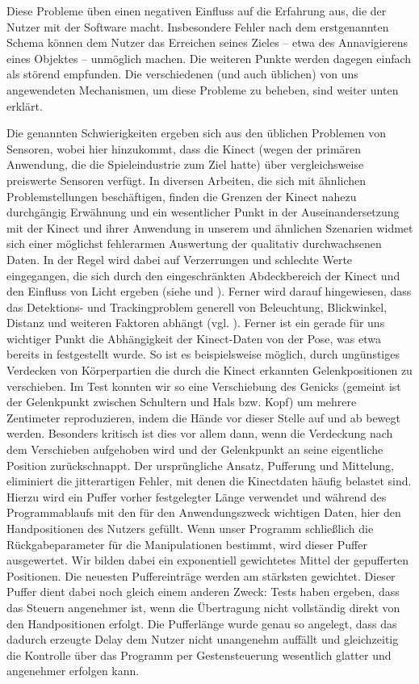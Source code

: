 \par
	Diese Probleme üben einen negativen Einfluss auf die Erfahrung aus, die der Nutzer mit der Software macht. Insbesondere Fehler nach dem erstgenannten Schema können dem Nutzer das Erreichen seines Zieles -- etwa des Annavigierens eines Objektes -- unmöglich machen. Die weiteren Punkte werden dagegen einfach als störend empfunden. Die verschiedenen (und auch üblichen) von uns angewendeten Mechanismen, um diese Probleme zu beheben, sind weiter unten erklärt.\par
	Die genannten Schwierigkeiten ergeben sich aus den üblichen Problemen von Sensoren, wobei hier hinzukommt, dass die Kinect (wegen der primären Anwendung, die die Spieleindustrie zum Ziel hatte) über vergleichsweise preiswerte Sensoren verfügt. In diversen Arbeiten, die sich mit ähnlichen Problemstellungen beschäftigen, finden die Grenzen der Kinect nahezu durchgängig Erwähnung und ein wesentlicher Punkt in der Auseinandersetzung mit der Kinect und ihrer Anwendung in unserem und ähnlichen Szenarien widmet sich einer möglichst fehlerarmen Auswertung der qualitativ durchwachsenen Daten. In der Regel wird dabei auf Verzerrungen und schlechte Werte eingegangen, die sich durch den eingeschränkten \glqq Abdeckbereich\grqq{} der Kinect und den Einfluss von Licht ergeben (siehe \cite{bodyprop} und \cite{kinectlight}). Ferner wird darauf hingewiesen, dass das Detektions- und Trackingproblem generell von Beleuchtung, Blickwinkel, Distanz und weiteren Faktoren abhängt (vgl. \cite{thermalsens}). Ferner ist ein gerade für uns wichtiger Punkt die Abhängigkeit der Kinect-Daten von der Pose, was etwa bereits in \cite{biomid} festgestellt wurde. So ist es beispielsweise möglich, durch ungünstiges Verdecken von Körperpartien die durch die Kinect erkannten Gelenkpositionen zu verschieben. Im Test konnten wir so eine Verschiebung des Genicks (gemeint ist der Gelenkpunkt zwischen Schultern und Hals bzw. Kopf) um mehrere Zentimeter reproduzieren, indem die Hände vor dieser Stelle auf und ab bewegt werden. Besonders kritisch ist dies vor allem dann, wenn die Verdeckung nach dem Verschieben aufgehoben wird und der Gelenkpunkt an seine eigentliche Position \glqq zurückschnappt\grqq{}.
	Der ursprüngliche Ansatz, Pufferung und Mittelung, eliminiert die jitterartigen Fehler, mit denen die Kinectdaten häufig belastet sind. Hierzu wird ein Puffer vorher festgelegter Länge verwendet und während des Programmablaufs mit den für den Anwendungszweck wichtigen Daten, hier den Handpositionen des Nutzers gefüllt. Wenn unser Programm schließlich die Rückgabeparameter für die Manipulationen bestimmt, wird dieser Puffer ausgewertet. Wir bilden dabei ein exponentiell gewichtetes Mittel der gepufferten Positionen. Die neuesten Puffereinträge werden am stärksten gewichtet. Dieser Puffer dient dabei noch gleich einem anderen Zweck: Tests haben ergeben, dass das Steuern angenehmer ist, wenn die Übertragung nicht vollständig direkt von den Handpositionen erfolgt. Die Pufferlänge wurde genau so angelegt, dass das dadurch erzeugte Delay dem Nutzer nicht unangenehm auffällt und gleichzeitig die Kontrolle über das Programm per Gestensteuerung wesentlich glatter und angenehmer erfolgen kann.\par 
